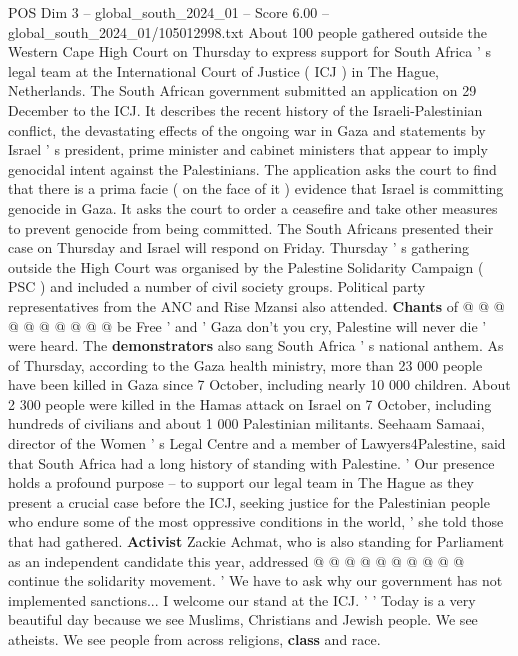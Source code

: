 \begin{textsample}{POS Dim 3 – global\_south\_2024\_01 – Score 6.00 – global\_south\_2024\_01/105012998.txt}  \label{ex:f3_pos_355}
About 100 people gathered outside the Western Cape High Court on Thursday to express support for South Africa ' s legal team at the International Court of Justice ( ICJ ) in The Hague, Netherlands.
The South African government submitted an application on 29 December to the ICJ.
It describes the recent history of the Israeli-Palestinian conflict, the devastating effects of the ongoing war in Gaza and statements by Israel ' s president, prime minister and cabinet ministers that appear to imply genocidal intent against the Palestinians.
The application asks the court to find that there is a prima facie ( on the face of it ) evidence that Israel is committing genocide in Gaza.
It asks the court to order a ceasefire and take other measures to prevent genocide from being committed.
The South Africans presented their case on Thursday and Israel will respond on Friday.
Thursday ' s gathering outside the High Court was organised by the Palestine Solidarity Campaign ( PSC ) and included a number of civil society groups.
Political party representatives from the ANC and Rise Mzansi also attended. \textbf{Chants} of @ @ @ @ @ @ @ @ @ @ be Free ' and ' Gaza don't you cry, Palestine will never die ' were heard.
The \textbf{demonstrators} also sang South Africa ' s national anthem.
As of Thursday, according to the Gaza health ministry, more than 23 000 people have been killed in Gaza since 7 October, including nearly 10 000 children.
About 2 300 people were killed in the Hamas attack on Israel on 7 October, including hundreds of civilians and about 1 000 Palestinian militants.
Seehaam Samaai, director of the Women ' s Legal Centre and a member of Lawyers4Palestine, said that South Africa had a long history of standing with Palestine. ' Our presence holds a profound purpose -- to support our legal team in The Hague as they present a crucial case before the ICJ, seeking justice for the Palestinian people who endure some of the most oppressive conditions in the world, ' she told those that had gathered. \textbf{Activist} Zackie Achmat, who is also standing for Parliament as an independent candidate this year, addressed @ @ @ @ @ @ @ @ @ @ continue the solidarity movement. ' We have to ask why our government has not implemented sanctions...
I welcome our stand at the ICJ. ' ' Today is a very beautiful day because we see Muslims, Christians and Jewish people.
We see atheists.
We see people from across religions, \textbf{class} and race.

\end{textsample}
